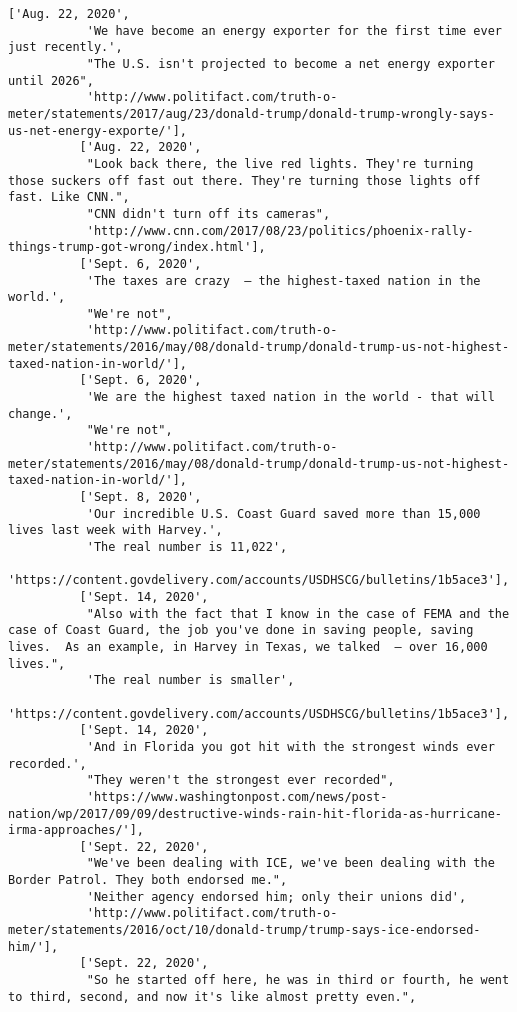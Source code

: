 \documentclass[11pt]{article}
\begin{document}
\begin{Verbatim}[commandchars=\\\{\}]
          ['Aug. 22, 2020',
           'We have become an energy exporter for the first time ever just recently.',
           "The U.S. isn't projected to become a net energy exporter until 2026",
           'http://www.politifact.com/truth-o-meter/statements/2017/aug/23/donald-trump/donald-trump-wrongly-says-us-net-energy-exporte/'],
          ['Aug. 22, 2020',
           "Look back there, the live red lights. They're turning those suckers off fast out there. They're turning those lights off fast. Like CNN.",
           "CNN didn't turn off its cameras",
           'http://www.cnn.com/2017/08/23/politics/phoenix-rally-things-trump-got-wrong/index.html'],
          ['Sept. 6, 2020',
           'The taxes are crazy  – the highest-taxed nation in the world.',
           "We're not",
           'http://www.politifact.com/truth-o-meter/statements/2016/may/08/donald-trump/donald-trump-us-not-highest-taxed-nation-in-world/'],
          ['Sept. 6, 2020',
           'We are the highest taxed nation in the world - that will change.',
           "We're not",
           'http://www.politifact.com/truth-o-meter/statements/2016/may/08/donald-trump/donald-trump-us-not-highest-taxed-nation-in-world/'],
          ['Sept. 8, 2020',
           'Our incredible U.S. Coast Guard saved more than 15,000 lives last week with Harvey.',
           'The real number is 11,022',
           'https://content.govdelivery.com/accounts/USDHSCG/bulletins/1b5ace3'],
          ['Sept. 14, 2020',
           "Also with the fact that I know in the case of FEMA and the case of Coast Guard, the job you've done in saving people, saving lives.  As an example, in Harvey in Texas, we talked  – over 16,000 lives.",
           'The real number is smaller',
           'https://content.govdelivery.com/accounts/USDHSCG/bulletins/1b5ace3'],
          ['Sept. 14, 2020',
           'And in Florida you got hit with the strongest winds ever recorded.',
           "They weren't the strongest ever recorded",
           'https://www.washingtonpost.com/news/post-nation/wp/2017/09/09/destructive-winds-rain-hit-florida-as-hurricane-irma-approaches/'],
          ['Sept. 22, 2020',
           "We've been dealing with ICE, we've been dealing with the Border Patrol. They both endorsed me.",
           'Neither agency endorsed him; only their unions did',
           'http://www.politifact.com/truth-o-meter/statements/2016/oct/10/donald-trump/trump-says-ice-endorsed-him/'],
          ['Sept. 22, 2020',
           "So he started off here, he was in third or fourth, he went to third, second, and now it's like almost pretty even.",

\end{Verbatim}
\end{document}
